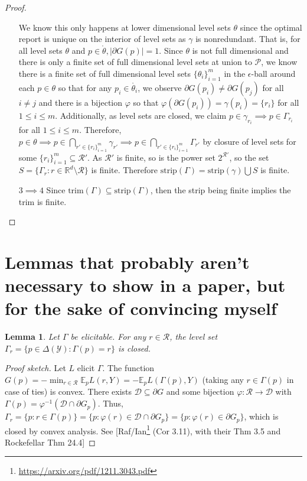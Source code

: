 \documentclass[12pt]{article}
\newcommand{\reals}{\mathbb{R}}
\newcommand{\D}{\mathcal{D}}
\newcommand{\E}{\mathbb{E}}
\renewcommand{\P}{\mathcal{P}}
\newcommand{\R}{\mathcal{R}}
\newcommand{\Y}{\mathcal{Y}}
\newcommand{\inter}[1]{\mathring{#1}}%
\newcommand{\trim}{\mathrm{trim}}
\newcommand{\strip}{\mathrm{strip}}
\newtheorem{lemma}{Lemma}
\begin{document}
\begin{proof}
\begin{enumerate}
			
	We know this only happens at lower dimensional level sets $\theta$ since the optimal report is unique on the interior of level sets as $\gamma$ is nonredundant.
	That is, for all level sets $\theta$ and $p \in \inter \theta, |\partial G(p)| = 1$.
	Since $\theta$ is not full dimensional and there is only a finite set of full dimensional level sets at union to $\P$, we know there is a finite set of full dimensional level sets $\{\theta_i\}_{i=1}^m$ in the $\epsilon$-ball around each $p \in \theta$ so that for any $p_i \in \inter{\theta_i}$, we observe $\partial G(p_i) \neq \partial G(p_j)$ for all $i \neq j$ and there is a bijection $\varphi$ so that $\varphi(\partial G(p_i)) = \gamma(p_i) = \{r_i\}$ for all $1 \leq i \leq m$.
	Additionally, as level sets are closed, we claim $p \in \gamma_{r_i} \implies p \in \Gamma_{r_i}$ for all $1 \leq i \leq m$.
	Therefore, $p \in \theta \implies p \in \bigcap_{r' \in \{r_i\}_{i=1}^m} \gamma_{r'}\implies p \in \bigcap_{r' \in \{r_i\}_{i=1}^m} \Gamma_{r'}$ by closure of level sets for some $\{r_i\}_{i=1}^m \subseteq \R'$.
	As $\R'$ is finite, so is the power set $2^{\R'}$, so the set $S = \{\Gamma_r : r \in \reals^d \setminus \R \}$ is finite.
	Therefore $\strip(\Gamma) = \strip(\gamma) \bigcup S$ is finite. 
		

\item [$3 \implies 4$]
Since $\trim(\Gamma) \subseteq \strip(\Gamma)$, then the strip being finite implies the trim is finite.


\end{enumerate} 

\end{proof}



\section{Lemmas that probably aren't necessary to show in a paper, but for the sake of convincing myself}

\begin{lemma}\label{lem:closed-level-sets}
	Let $\Gamma$ be elicitable.
	For any $r\in\R$, the level set $\Gamma_r = \{ p \in \Delta(\Y) : \Gamma(p) = r \}$ is closed.
\end{lemma}
\begin{proof}[Proof sketch]
	Let $L$ elicit $\Gamma$.
	The function $G(p) = -\min_{r\in\R} \E_p L(r,Y) = -\E_p L(\Gamma(p),Y)$ (taking any $r\in\Gamma(p)$ in case of ties) is convex.
	There exists $\D \subseteq \partial G$ and some bijection $\varphi : \R \to \D$ with $\Gamma(p) = \varphi^{-1}(\D\cap \partial G_p)$.
	Thus, $\Gamma_r = \{p : r\in\Gamma(p)\} = \{p : \varphi(r) \in \D\cap\partial G_p\} = \{p : \varphi(r) \in \partial G_p\}$, which is closed by convex analysis.
	See [Raf/Ian\footnote{\url{https://arxiv.org/pdf/1211.3043.pdf}} (Cor 3.11), with their Thm 3.5 and Rockefellar Thm 24.4]  
\end{proof}
\end{document}
